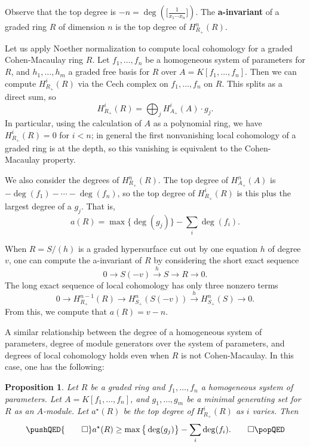 \documentclass[12pt]{amsart}
\newtheorem{proposition}[theorem]{Proposition}
\theoremstyle{definition}
\numberwithin{equation}{theorem}
\def\to{\longrightarrow}
\begin{document}
Observe that the top degree is $-n = \deg(\big[ \frac{1}{x_1 \cdots x_n} \big])$. The \textbf{a-invariant} of a graded ring $R$ of dimension $n$ is the top degree of $H^n_{R_+}(R)$. 

Let us apply Noether normalization to compute local cohomology for a graded Cohen-Macaulay ring $R$. Let $f_1,\dots,f_n$ be a homogeneous system of parameters for $R$, and $h_1,\dots,h_m$ a graded free basis for $R$ over $A=K[f_1,\dots,f_n]$. Then we can compute $H^i_{R_+}(R)$ via the Cech complex on $f_1,\dots,f_n$ on $R$. This splits as a direct sum, so
\[ H^i_{R_+}(R) = \bigoplus_j H^i_{A_+}(A) \cdot g_j.\]
In particular, using the calculation of $A$ as a polynomial ring, we have $H^i_{R_+}(R)=0$ for $i<n$; in general the first nonvanishing local cohomology of a graded ring is at the depth, so this vanishing is equivalent to the Cohen-Macaulay property. 

We also consider the degrees of $H^n_{R_+}(R)$. The top degree of $H^n_{A_+}(A)$ is $-\deg(f_1) - \cdots - \deg(f_n)$, so the top degree of $H^i_{R_+}(R)$ is this plus the largest degree of a $g_j$. That is,
\[ a(R) = \max\big\{ \deg(g_j)\big\} - \sum_i \deg(f_i).\]



When $R=S/(h)$ is a graded hypersurface cut out by one equation $h$ of degree $v$, one can compute the a-invariant of $R$ by considering the short exact sequence
\[ 0 \to S(-v) \stackrel{h}{\to} S \to R \to 0.\]
The long exact sequence of local cohomology has only three nonzero terms
\[ 0 \to H^{n-1}_{R_+}(R) \to H^n_{S_+}(S(-v))  \stackrel{h}{\to}  H^n_{S_+}(S) \to 0.\]
From this, we compute that $a(R)=v-n$. 


A similar relationship between the degree of a homogeneous system of parameters, degree of module generators over the system of parameters, and degrees of local cohomology holds even when $R$ is not Cohen-Macaulay. In this case, one has the following:



\begin{proposition} Let $R$ be a graded ring and $f_1,\dots,f_n$ a homogeneous system of parameters. Let $A=K[f_1,\dots,f_n]$, and $g_1,\dots,g_m$ be a minimal generating set for $R$ as an $A$-module. Let $a^{\star}(R)$ be the top degree of $H^i_{R_+}(R)$ as $i$ varies. Then
\[ \pushQED{\qed} a^{\star}(R) \geq \max\big\{ \deg(g_j)\big\} - \sum_i \deg(f_i).   \qedhere
      \popQED
\]
\end{proposition}
\end{document}
